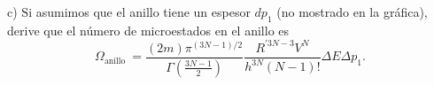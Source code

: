 c) $\mathrm{Si}$ asumimos que el anillo tiene un espesor $d p_1$ (no mostrado en la gráfica), derive que el número de microestados en el anillo es
$$
\Omega_{\text {anillo }}=\frac{(2 m) \pi^{(3 N-1) / 2}}{\Gamma\left(\frac{3 N-1}{2}\right)} \frac{R^{\prime 3 N-3} V^N}{h^{3 N}(N-1) !} \Delta E \Delta p_1 .
$$